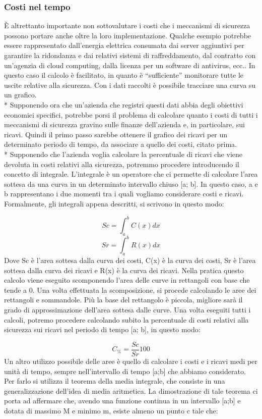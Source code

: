 \documentclass[12pt]{article}
\begin{document}
\subsubsection{Costi nel tempo}
È altrettanto importante non sottovalutare i costi che i meccanismi di sicurezza possono portare anche oltre la loro implementazione. Qualche esempio potrebbe essere rappresentato dall’energia elettrica consumata dai server aggiuntivi per garantire la ridondanza e dai relativi sistemi di raffreddamento, dal contratto con un’agenzia di cloud computing, dalla licenza per un software di antivirus, ecc..
In questo caso il calcolo è facilitato, in quanto è “sufficiente” monitorare tutte le uscite relative alla sicurezza.
Con i dati raccolti è possibile tracciare una curva su un grafico.\\*
Supponendo ora che un’azienda che registri questi dati abbia degli obiettivi economici specifici, potrebbe porsi il problema di calcolare quanto i costi di tutti i meccanismi di sicurezza gravino sulle finanze dell’azienda e, in particolare, sui ricavi.
Quindi il primo passo sarebbe ottenere il grafico dei ricavi per un determinato periodo di tempo, da associare a quello dei costi, citato prima.\\*
Supponendo che l’azienda voglia calcolare la percentuale di ricavi che viene devoluta in costi relativi alla sicurezza, potremmo procedere introducendo il concetto di integrale.
L’integrale è un operatore che ci permette di calcolare l’area sottesa da una curva in un determinato intervallo chiuso [a; b].
In questo caso, a e b rappresentano i due momenti tra i quali vogliamo considerare costi e ricavi. Formalmente, gli integrali appena descritti, si scrivono in questo modo:

\[Sc= \int_{a}^{b} C(x)dx\]
\[Sr= \int_{a}^{b} R(x)dx\]
\newline
Dove Sc è l’area sottesa dalla curva dei costi, C(x) è la curva dei costi, Sr è l’area sottesa dalla curva dei ricavi e R(x) è la curva dei ricavi.
Nella pratica questo calcolo viene eseguito scomponendo l’area delle curve in rettangoli con base che tende a 0. Una volta effettuata la scomposizione, si procede calcolando le aree dei rettangoli e sommandole.
Più la base del rettangolo è piccola, migliore sarà il grado di approssimazione dell’area sottesa dalle curve.
Una volta eseguiti tutti i calcoli, potremo procedere calcolando subito la percentuale di costi relativi alla sicurezza sui ricavi nel periodo di tempo [a; b], in questo modo:


\[C_\%=\frac{Sc}{Sr}100\]
Un altro utilizzo possibile delle aree è quello di calcolare i costi e i ricavi medi per unità di tempo, sempre nell’intervallo di tempo [a;b] che abbiamo considerato.
Per farlo si utilizza il teorema della media integrale, che consiste in una generalizzazione dell’idea di media aritmetica.
La dimostrazione di tale teorema ci porta ad affermare che, avendo una funzione continua in un intervallo [a;b] e dotata di massimo M e minimo m, esiste almeno un punto c tale che:
\end{document}
